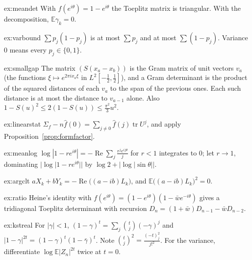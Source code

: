 \begin{hint}{ex:meandet}
With $f(e^{i\theta})=1-e^{i\theta}$ the Toeplitz matrix is triangular. With the decomposition, $\mathbb E\gamma_k=0$.
\end{hint}

\begin{hint}{ex:varbound}
$\sum p_j(1-p_j)$ is at most $\sum p_j$ and at most $\sum(1-p_j)$. Variance $0$ means every $p_j\in\{0,1\}$.
\end{hint}

\begin{hint}{ex:smallgap}
The matrix $(S(x_a-x_b))$ is the Gram matrix of unit vectors $v_a$ (the functions $\xi\mapsto e^{2\pi ix_a\xi}$ in $L^2[-\frac12,\frac12]$), and a Gram determinant is the product of the squared distances of each $v_a$ to the span of the previous ones. Each such distance is at most the distance to $v_{a-1}$ alone. Also $1-S(u)^2\le2(1-S(u))\le\frac{\pi^2}3u^2$.
\end{hint}

\begin{hint}{ex:linearstat}
$\Sigma_f-n\hat f(0)=\sum_{j\ne0}\hat f(j)\operatorname{tr}U^j$, and apply Proposition~\ref{prop:formfactor}.
\end{hint}

\begin{hint}{ex:meanlog}
$\log|1-re^{i\theta}|=-\operatorname{Re}\sum_j\frac{r^je^{ij\theta}}j$ for $r<1$ integrates to $0$; let $r\to1$, dominating $|\log|1-re^{i\theta}||$ by $\log2+|\log|\sin\theta||$.
\end{hint}

\begin{hint}{ex:argclt}
$aX_k+bY_k=-\operatorname{Re}\bigl((a-ib)L_k\bigr)$, and $\mathbb E\bigl((a-ib)L_k\bigr)^2=0$.
\end{hint}

\begin{hint}{ex:ratio}
Heine's identity with $f(e^{i\theta})=(1-e^{i\theta})(1-\bar we^{-i\theta})$ gives a tridiagonal Toeplitz determinant with recursion $D_n=(1+\bar w)D_{n-1}-\bar wD_{n-2}$.
\end{hint}

\begin{hint}{ex:kstreal}
For $|\gamma|<1$, $(1-\gamma)^t=\sum_j\binom tj(-\gamma)^j$ and $|1-\gamma|^{2t}=(1-\gamma)^t(1-\bar\gamma)^t$. Note $\binom tj^2=\frac{(-t)_j^2}{j!^2}$. For the variance, differentiate $\log\mathbb E|Z_n|^{2t}$ twice at $t=0$.
\end{hint}

